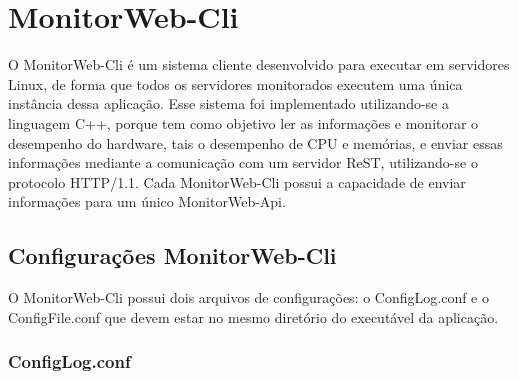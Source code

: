 

\section{MonitorWeb-Cli}\label{sec:MonitorWeb-Cli}

O MonitorWeb-Cli é um sistema cliente desenvolvido para executar em servidores Linux, de forma que todos os servidores monitorados executem uma única instância dessa aplicação. Esse sistema foi implementado utilizando-se a linguagem C++, porque tem como objetivo ler as informações e monitorar o desempenho do hardware, tais o desempenho de CPU e memórias, e enviar essas informações mediante a comunicação com um servidor ReST, utilizando-se o protocolo HTTP/1.1. Cada MonitorWeb-Cli possui a capacidade de enviar informações para um único MonitorWeb-Api.

\subsection{Configurações MonitorWeb-Cli}\label{subsubsec:ConfiguracesMonitorWeb-Cli}

O MonitorWeb-Cli possui dois arquivos de configurações: o ConfigLog.conf e o  ConfigFile.conf que devem estar no mesmo diretório do executável da aplicação.

\subsubsection{ConfigLog.conf}\label{subsubsec:ConfiguracesMonitorWeb-CliConfiglog}

